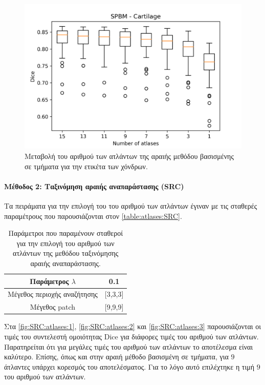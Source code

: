 \documentclass[a4paper,12pt]{article}
\newcommand{\paragraphLine}[1]{\paragraph{#1}\mbox{}}
\begin{document}
\begin{figure}[H]
    \centering
    \includegraphics[width=0.85\linewidth]{SPBM_Number_of_atlases_Cartilage_plot.png}
    \caption{Μεταβολή του αριθμού των ατλάντων της αραιής μεθόδου βασισμένης σε
             τμήματα για την ετικέτα των χόνδρων.}
    \label{fig:SPBM:atlases:3}
\end{figure}

\paragraphLine{Μέθοδος 2: Ταξινόμηση αραιής αναπαράστασης (SRC)}

Τα πειράματα για την επιλογή του του αριθμού των ατλάντων έγιναν με τις σταθερές
παραμέτρους που παρουσιάζονται στον \autoref{table:atlases:SRC}.

\begin{table}[h!]
    \centering
    \begin{tabular}{|c|c|} 
        \hline
        Παράμετρος $\lambda$ & 0.1 \\ 
        \hline
        Μέγεθος περιοχής αναζήτησης & [3,3,3] \\ 
        \hline
        Μέγεθος patch & [9,9,9] \\ 
        \hline
    \end{tabular}
    \caption{Παράμετροι που παραμένουν σταθεροί για την επιλογή του αριθμού των
             ατλάντων της μεθόδου ταξινόμησης αραιής αναπαράστασης.}
    \label{table:atlases:SRC}
\end{table}

Στα \autoref{fig:SRC:atlases:1}, \autoref{fig:SRC:atlases:2} και
\autoref{fig:SRC:atlases:3} παρουσιάζονται οι τιμές του συντελεστή ομοιότητας
Dice για διάφορες τιμές του αριθμού των ατλάντων. Παρατηρείται ότι για μεγάλες
τιμές του αριθμού των ατλάντων το αποτέλεσμα είναι καλύτερο. Επίσης, όπως και
στην αραιή μέθοδο βασισμένη σε τμήματα, για $9$ άτλαντες υπάρχει κορεσμός του
αποτελέσματος. Για το λόγο αυτό επιλέχτηκε η τιμή $9$ του αριθμού των ατλάντων.
\end{document}
